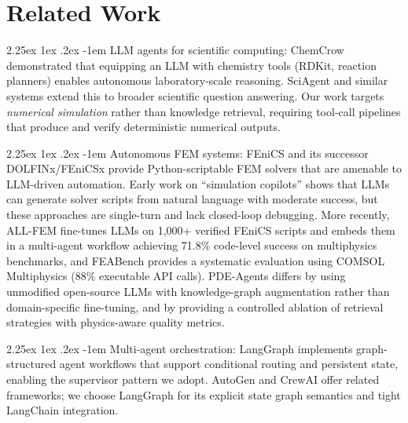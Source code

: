\documentclass[preprint,review,12pt]{elsarticle}
\makeatletter
\renewcommand\paragraph{\@startsection{paragraph}{4}{\z@}%
  {2.25ex \@plus1ex \@minus.2ex}%
  {-1em}%
  {\normalfont\normalsize\bfseries}}
\makeatother
\begin{document}
\section{Related Work}
\label{sec:related}

\paragraph{LLM agents for scientific computing:}
ChemCrow \citep{bran2023chemcrow} demonstrated that equipping an LLM with
chemistry tools (RDKit, reaction planners) enables autonomous laboratory-scale
reasoning.  SciAgent \citep{ma2024sciagent} and similar systems extend this
to broader scientific question answering.  Our work targets \emph{numerical
simulation} rather than knowledge retrieval, requiring tool-call pipelines that
produce and verify deterministic numerical outputs.

\paragraph{Autonomous FEM systems:}
FEniCS \citep{logg2012fenics} and its successor DOLFINx/FEniCSx
\citep{barrata2023dolfinx} provide Python-scriptable FEM solvers that are
amenable to LLM-driven automation.  Early work on ``simulation copilots''
\citep{bauer2023llm, jiang2024llm} shows that LLMs can generate solver
scripts from natural language with moderate success, but these approaches are
single-turn and lack closed-loop debugging.  More recently, ALL-FEM
\citep{deotale2026allfem} fine-tunes LLMs on 1{,}000+ verified FEniCS scripts
and embeds them in a multi-agent workflow achieving 71.8\% code-level success
on multiphysics benchmarks, and FEABench \citep{mudur2025feabench} provides a
systematic evaluation using COMSOL Multiphysics (88\% executable API calls).
PDE-Agents differs by using unmodified open-source LLMs with
knowledge-graph augmentation rather than domain-specific fine-tuning, and by
providing a controlled ablation of retrieval strategies with physics-aware
quality metrics.

\paragraph{Multi-agent orchestration:}
LangGraph \citep{langgraph2024} implements graph-structured agent workflows
that support conditional routing and persistent state, enabling the supervisor
pattern we adopt.  AutoGen \citep{wu2023autogen} and CrewAI \citep{crewai2024}
offer related frameworks; we choose LangGraph for its explicit
state graph semantics and tight LangChain integration.
\end{document}
